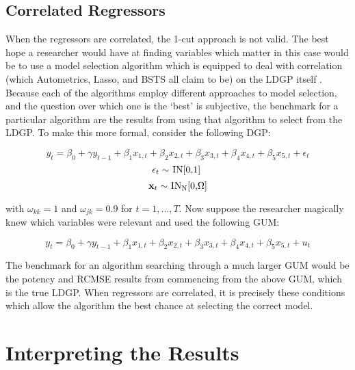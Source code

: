 \documentclass[11pt, oneside]{book}   	%
\begin{document}
 

\subsection{Correlated Regressors}

When the regressors are correlated, the 1-cut approach is not valid. The best hope a researcher would have at finding variables which matter in this case would be to use a model selection algorithm which is equipped to deal with correlation (which Autometrics, Lasso, and BSTS all claim to be) on the LDGP itself . Because each of the algorithms employ different approaches to model selection, and the question over which one is the `best' is subjective, the benchmark for a particular algorithm are the results from using that algorithm to select from the LDGP.  To make this more formal, consider the following DGP:


$$y_{t}=\beta_{0} + \gamma y_{t-1}+\beta_{1}x_{1,t}+\beta_{2}x_{2,t}+ \beta_{3}x_{3,t}+ \beta_{4}x_{4,t}+ \beta_{5}x_{5,t} + \epsilon_{t}$$
$$\centerline{$\epsilon_{t} \sim $ IN[0,1] }$$
 $$\centerline{$\textbf{x}_{t} \sim $ IN\textsubscript{N}[0,$\Omega$]}$$

with $\omega_{kk} = 1$ and $\omega_{jk} = 0.9 $ for $t=1,...,T$. Now suppose the researcher magically knew which variables were relevant and used the following GUM:

$$y_{t}=\beta_{0} + \gamma y_{t-1}+\beta_{1}x_{1,t}+\beta_{2}x_{2,t}+ \beta_{3}x_{3,t}+ \beta_{4}x_{4,t}+ \beta_{5}x_{5,t} + u_{t}$$

The benchmark for an algorithm searching through a much larger GUM would be the potency and RCMSE results from commencing from the above GUM, which is the true LDGP. When regressors are correlated, it is precisely these conditions which allow the algorithm the best chance at selecting the correct model. 




\section{Interpreting the Results}
\end{document}
